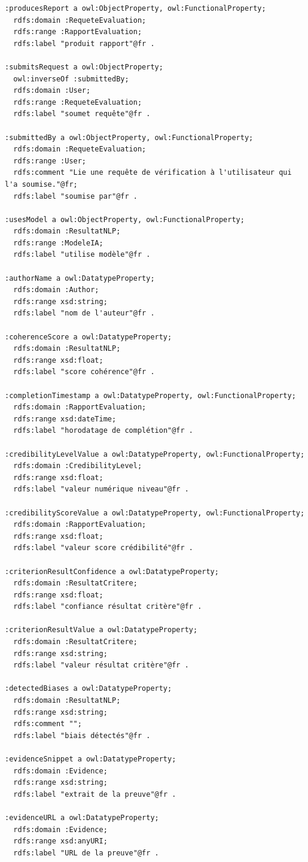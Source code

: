 \documentclass[9pt,twocolumn,french]{article}
\begin{document}
\begin{lstlisting}[language=Turtle,basicstyle=\ttfamily\tiny,frame=single]
:producesReport a owl:ObjectProperty, owl:FunctionalProperty;
  rdfs:domain :RequeteEvaluation;
  rdfs:range :RapportEvaluation;
  rdfs:label "produit rapport"@fr .

:submitsRequest a owl:ObjectProperty;
  owl:inverseOf :submittedBy;
  rdfs:domain :User;
  rdfs:range :RequeteEvaluation;
  rdfs:label "soumet requête"@fr .

:submittedBy a owl:ObjectProperty, owl:FunctionalProperty;
  rdfs:domain :RequeteEvaluation;
  rdfs:range :User;
  rdfs:comment "Lie une requête de vérification à l'utilisateur qui l'a soumise."@fr;
  rdfs:label "soumise par"@fr .

:usesModel a owl:ObjectProperty, owl:FunctionalProperty;
  rdfs:domain :ResultatNLP;
  rdfs:range :ModeleIA;
  rdfs:label "utilise modèle"@fr .

:authorName a owl:DatatypeProperty;
  rdfs:domain :Author;
  rdfs:range xsd:string;
  rdfs:label "nom de l'auteur"@fr .

:coherenceScore a owl:DatatypeProperty;
  rdfs:domain :ResultatNLP;
  rdfs:range xsd:float;
  rdfs:label "score cohérence"@fr .

:completionTimestamp a owl:DatatypeProperty, owl:FunctionalProperty;
  rdfs:domain :RapportEvaluation;
  rdfs:range xsd:dateTime;
  rdfs:label "horodatage de complétion"@fr .

:credibilityLevelValue a owl:DatatypeProperty, owl:FunctionalProperty;
  rdfs:domain :CredibilityLevel;
  rdfs:range xsd:float;
  rdfs:label "valeur numérique niveau"@fr .

:credibilityScoreValue a owl:DatatypeProperty, owl:FunctionalProperty;
  rdfs:domain :RapportEvaluation;
  rdfs:range xsd:float;
  rdfs:label "valeur score crédibilité"@fr .

:criterionResultConfidence a owl:DatatypeProperty;
  rdfs:domain :ResultatCritere;
  rdfs:range xsd:float;
  rdfs:label "confiance résultat critère"@fr .

:criterionResultValue a owl:DatatypeProperty;
  rdfs:domain :ResultatCritere;
  rdfs:range xsd:string;
  rdfs:label "valeur résultat critère"@fr .

:detectedBiases a owl:DatatypeProperty;
  rdfs:domain :ResultatNLP;
  rdfs:range xsd:string;
  rdfs:comment "";
  rdfs:label "biais détectés"@fr .

:evidenceSnippet a owl:DatatypeProperty;
  rdfs:domain :Evidence;
  rdfs:range xsd:string;
  rdfs:label "extrait de la preuve"@fr .

:evidenceURL a owl:DatatypeProperty;
  rdfs:domain :Evidence;
  rdfs:range xsd:anyURI;
  rdfs:label "URL de la preuve"@fr .


\end{lstlisting}
\end{document}

